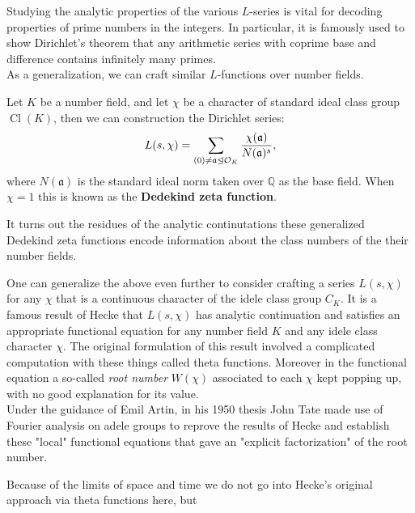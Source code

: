 \documentclass[11pt, x11names, openany]{book}
\newcommand{\qq}{\mathbb{Q}}
\newcommand{\fraka}{\mathfrak{a}}
\newcommand{\ideal}{\trianglelefteq}
\DeclareMathOperator{\cl}{Cl}
\begin{document}
Studying the analytic properties of the various $L$-series is vital for decoding properties of prime numbers in the integers. In particular, it is famously used to show Dirichlet's theorem that any arithmetic series with coprime base and difference contains infinitely many primes.\\

As a generalization, we can craft similar $L$-functions over number fields.

\begin{example}
\label{example: Generalized Dedekind Zeta}
Let $K$ be a number field, and let $\chi$ be a character of standard ideal class group $\cl(K)$, then we can construction the Dirichlet series:
\begin{equation*}
    L(s, \chi) = \sum_{(0) \neq \fraka \ideal \calo_K} \frac{\chi(\fraka)}{N(\fraka)^s},
\end{equation*}
where $N(\fraka)$ is the standard ideal norm taken over $\qq$ as the base field. When $\chi = 1$ this is known as the \textbf{Dedekind zeta function}.
\end{example}

It turns out the residues of the analytic continutations these generalized Dedekind zeta functions encode information about the class numbers of the their number fields. 

One can generalize the above even further to consider crafting a series $L(s, \chi)$ for any $\chi$ that is a continuous character of the idele class group $C_K$. It is a famous result of Hecke that $L(s, \chi)$ has analytic continuation and satisfies an appropriate functional equation for any number field $K$ and any idele class character $\chi$. The original formulation of this result involved a complicated computation with these things called theta functions. Moreover in the functional equation a so-called \textit{root number} $W(\chi)$ associated to each $\chi$ kept popping up, with no good explanation for its value.\\
Under the guidance of Emil Artin, in his 1950 thesis John Tate made use of Fourier analysis on adele groups to reprove the results of Hecke and establish these "local" functional equations that gave an "explicit factorization" of the root number.

Because of the limits of space and time we do not go into Hecke's original approach via theta functions here, but 
\end{document}
